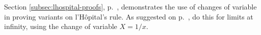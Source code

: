 Section \ref{subsec:lhospital-proofs}, p.~\pageref{subsec:lhospital-proofs},
demonstrates the use of changes of variable in proving variants on l'H\^{o}pital's rule.
As suggested on p.~\pageref{subsubsec:lhospital-proofs-at-infinity},
do this for limits at infinity, using the change of variable $X=1/x$.
